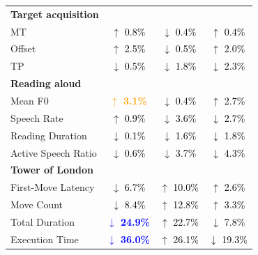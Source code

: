 \begin{table}[t]
\begin{tabular}{lccc}
\midrule
\multicolumn{4}{l}{\textbf{Target acquisition}} \\
\quad MT
& \textcolor{black}{\(\uparrow\) 0.8\%}
& \textcolor{black}{\(\downarrow\) 0.4\%}
& \textcolor{black}{\(\uparrow\) 0.4\%} \\
\quad Offset
& \textcolor{black}{\(\uparrow\) 2.5\%}
& \textcolor{black}{\(\downarrow\) 0.5\%}
& \textcolor{black}{\(\uparrow\) 2.0\%} \\
\quad TP
& \textcolor{black}{\(\downarrow\) 0.5\%}
& \textcolor{black}{\(\downarrow\) 1.8\%}
& \textcolor{black}{\(\downarrow\) 2.3\%} \\
\midrule
\multicolumn{4}{l}{\textbf{Reading aloud}} \\
\quad Mean F0
& \textcolor{orange}{\textbf{\boldmath\(\uparrow\) 3.1\%}}
& \textcolor{black}{\(\downarrow\) 0.4\%}
& \textcolor{black}{\(\uparrow\) 2.7\%} \\
\quad Speech Rate
& \textcolor{black}{\(\uparrow\) 0.9\%}
& \textcolor{black}{\(\downarrow\) 3.6\%}
& \textcolor{black}{\(\downarrow\) 2.7\%} \\
\quad Reading Duration
& \textcolor{black}{\(\downarrow\) 0.1\%}
& \textcolor{black}{\(\downarrow\) 1.6\%}
& \textcolor{black}{\(\downarrow\) 1.8\%} \\
\quad Active Speech Ratio
& \textcolor{black}{\(\downarrow\) 0.6\%}
& \textcolor{black}{\(\downarrow\) 3.7\%}
& \textcolor{black}{\(\downarrow\) 4.3\%} \\
\midrule
\multicolumn{4}{l}{\textbf{Tower of London}} \\
\quad First-Move Latency
& \textcolor{black}{\(\downarrow\) 6.7\%}
& \textcolor{black}{\(\uparrow\) 10.0\%}
& \textcolor{black}{\(\uparrow\) 2.6\%} \\
\quad Move Count
& \textcolor{black}{\(\downarrow\) 8.4\%}
& \textcolor{black}{\(\uparrow\) 12.8\%}
& \textcolor{black}{\(\uparrow\) 3.3\%} \\
\quad Total Duration
& \textcolor{blue}{\textbf{\boldmath\(\downarrow\) 24.9\%}}
& \textcolor{black}{\(\uparrow\) 22.7\%}
& \textcolor{black}{\(\downarrow\) 7.8\%} \\
\quad Execution Time
& \textcolor{blue}{\textbf{\boldmath\(\downarrow\) 36.0\%}}
& \textcolor{black}{\(\uparrow\) 26.1\%}
& \textcolor{black}{\(\downarrow\) 19.3\%} \\
\bottomrule
\end{tabular}
\end{table}